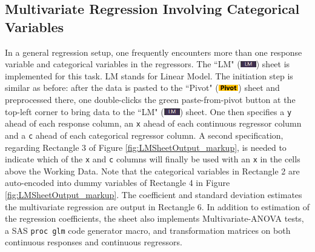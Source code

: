 \documentclass[article]{jss}
\newcommand{\shtPivot}{``Pivot" (\includegraphics[height=8pt, keepaspectratio=true]{PivotSheetTab_png}) }
\newcommand{\shtLM}{``LM" (\includegraphics[height=8pt, keepaspectratio=true]{LMSheetTab_png}) }
\begin{document}
        
        \subsection[egLM]{Multivariate Regression Involving Categorical Variables}
        In a general regression setup, one frequently encounters more than one response variable and categorical variables in the regressors. The \shtLM sheet is implemented for this task. LM stands for Linear Model. The initiation step is similar as before: after the data is pasted to the \shtPivot sheet and preprocessed there, one double-clicks the green paste-from-pivot button at the top-left corner to bring data to the \shtLM sheet. One then specifies a \texttt{y} ahead of each response column, an \texttt{x} ahead of each continuous regressor column and a \texttt{c} ahead of each categorical regressor column. A second specification, regarding Rectangle 3 of Figure \ref{fig:LMSheetOutput_markup}, is needed to indicate which of the \texttt{x} and \texttt{c} columns will finally be used with an \texttt{x} in the cells above the Working Data. Note that the categorical variables in Rectangle 2 are auto-encoded into dummy variables of Rectangle 4 in Figure \ref{fig:LMSheetOutput_markup}. The coefficient and standard deviation estimates the multivariate regression are output in Rectangle 6.
        In addition to estimation of the regression coefficients, the sheet also implements Multivariate-ANOVA tests, a SAS \texttt{proc glm} code generator macro, and transformation matrices on both continuous responses and continuous regressors.
\end{document}
